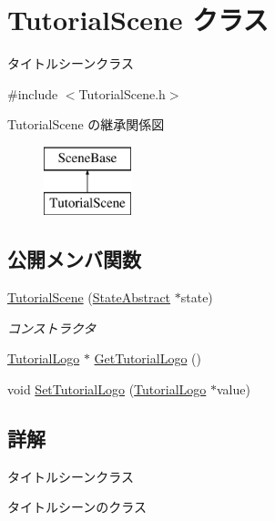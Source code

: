 \hypertarget{class_tutorial_scene}{}\section{Tutorial\+Scene クラス}
\label{class_tutorial_scene}


タイトルシーンクラス  




{\ttfamily \#include $<$Tutorial\+Scene.\+h$>$}

Tutorial\+Scene の継承関係図\begin{figure}[H]
\begin{center}
\leavevmode
\includegraphics[height=2.000000cm]{class_tutorial_scene}
\end{center}
\end{figure}
\subsection*{公開メンバ関数}
\begin{DoxyCompactItemize}
\item 
\mbox{\hyperlink{class_tutorial_scene_ad4cae04d2651e485f7f7233f4fd810a7}{Tutorial\+Scene}} (\mbox{\hyperlink{class_scene_base_1_1_state_abstract}{State\+Abstract}} $\ast$state)
\begin{DoxyCompactList}\small\item\em コンストラクタ \end{DoxyCompactList}\item 
\mbox{\hyperlink{class_tutorial_logo}{Tutorial\+Logo}} $\ast$ \mbox{\hyperlink{class_tutorial_scene_a7879e29d0af5f7bfbe3b458b4f14d50c}{Get\+Tutorial\+Logo}} ()
\item 
void \mbox{\hyperlink{class_tutorial_scene_a2157d0e553c71b46699765df4a164739}{Set\+Tutorial\+Logo}} (\mbox{\hyperlink{class_tutorial_logo}{Tutorial\+Logo}} $\ast$value)
\end{DoxyCompactItemize}


\subsection{詳解}
タイトルシーンクラス 

タイトルシーンのクラス 

